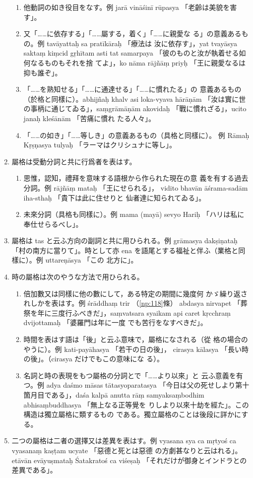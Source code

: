 \begin{enumerate}[label=(\arabic*)]
\begin{enumerate}[label=(\alph*)]
\item 他動詞の如き役目をなす。例 jarā vināśinī rūpasya
「老齡は美貌を害す」。
\item 又「……に依存する」「……屬する，着く」「……に親愛な
る」の意義あるもの。例 tavāyattaḥ sa pratīkāraḥ 「療法は
汝に依存す」，yat tvayāsya saktaṃ kiṃcid gṛhītam asti tat
samarpaya 「彼のものと汝が執着せる如何なるものもそれを捨
てよ」，ko nāma rājñāṃ priyḥ 「王に親愛なるは抑も誰ぞ」。
\item 「……を熟知せる」「……に通達せる」「……に慣れたる」の
意義あるもの（於格と同樣に）。abhijñaḥ khalv asi loka-vyava\-%
hārāṇām 「汝は實に世の事柄に通じてゐる」，saṃgrāmāṇām
akovidaḥ 「戰に慣れざる」，ucito janaḥ kleśānām 「苦痛に慣れ
たる人々」。
\item 「……の如き」「……等しき」の意義あるもの（具格と同樣に）。
例 Rāmaḥ Kṛṣṇasya tulyaḥ 「ラーマはクリシュナに等し」。
\end{enumerate}
\item 屬格は受動分詞と共に行爲者を表はす。
\begin{enumerate}[label=(\alph*)]
\item 思惟，認知，禮拜を意味する語根から作られた現在の意
義を有する過去分詞。例 rājñāṃ mataḥ 「王にせられる」，
vidito bhavān āśrama-sadām iha-sthaḥ 「貴下は此に住せりと
仙者達に知られてゐる」。
\item 未來分詞（具格も同樣に）。例 mama (mayā) sevyo
Hariḥ 「ハリは私に奉仕せらるべし」。
\end{enumerate}
\item 屬格は tas と云ふ方向の副詞と共に用ひられる。例
grāmasya dakṣiṇataḥ 「村の南方に當りて」。時として亦 ena
を語尾とする福祉と伴ふ（業格と同樣に）。例 uttareṇāsya 「この
北方に」。
\item 時の屬格は次のやうな方法で用ひられる。
\begin{enumerate}[label=(\alph*)]
\item 倍加數又は同樣に他の數にして，ある特定の期間に幾度何
かゞ繰り返されしかを表はす。例 śrāddhaṃ trir （\ref{np:118}條）
abdasya nirvapet 「葬祭を年に三度行ふべきだ」，saṃvatsara\-%
syaikam api caret kṛcchraṃ dvijottamaḥ 「婆羅門は年に一度
でも苦行をなすべきだ」。
\item 時間を表はす語は「後」と云ふ意味で，屬格になされる（從
格の場合のやうに）。例 kati-payāhasya 「若干の日の後」，
cirasya kālasya 「長い時の後」。（cirasya だけでもこの意味にな
る）。
\item 名詞と時の表現をもつ屬格の分詞とで「……より以來」と
云ふ意義を有つ。例 adya daśmo māsas tātasyoparatasya
「今日は父の死せしより第十箇月目である」，daśa kalpā anutta\-%
rāṃ samyaksaṃbodhim abhisaṃbuddhasya 「無上なる正等覺を
りしより以來十劫を經た」。この構造は獨立屬格に類するもの
である。獨立屬格のことは後段に詳かにする。
\end{enumerate}
\item 二つの屬格は二者の選擇又は差異を表はす。例 vyasana\-%
sya ca mṛtyoś ca vyasanaṃ kaṣṭam ucyate 「惡德と死とは惡德
の方劇甚なりと云はれる」。etāvān evāyuṣmataḥ Śatakratoś ca
viśeṣaḥ 「それだけが御身とインドラとの差異である」。
\end{enumerate}


